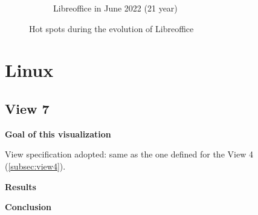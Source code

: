 \begin{figure}[h!]
\begin{subfigure}{0.48\textwidth}
        \caption{Libreoffice in June 2022 (21 year)} 
        \label{fig:Libre_V6_S6}
    \end{subfigure}
    
    \caption{Hot spots during the evolution of Libreoffice} 
    \label{fig:Libre_V6}
\end{figure}



\section{Linux}


\subsection{View 7}
\textbf{Goal of this visualization}

\bigbreak
View specification adopted: same as the one defined for the View 4 (\autoref{subsec:view4}).

\textbf{Results}



\bigbreak
\textbf{Conclusion} 


